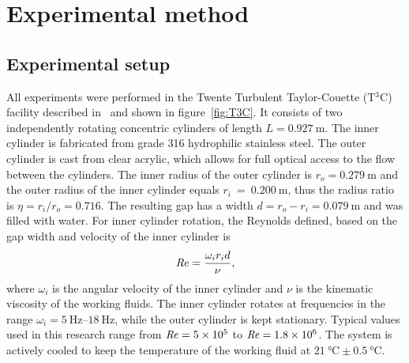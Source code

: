 \section{Experimental method}

\subsection{Experimental setup}
All experiments were performed in the Twente Turbulent Taylor-Couette (T$^3$C) facility described in~\citet{VanGils2011} and shown in figure~\ref{fig:T3C}.
 It consists of two independently rotating concentric cylinders of length $L = \SI{0.927}{\metre}$. The inner cylinder is fabricated from grade 316 hydrophilic stainless steel. The outer cylinder is cast from clear acrylic, which allows for full optical access to the flow between the cylinders. The inner radius of the outer cylinder is $r_o = \SI{0.279}{\metre}$ %
and the outer radius of the inner cylinder equals $r_i~=~\SI{0.200}{\metre}$, thus the radius ratio is $\eta = r_i / r_o = 0.716$. %
 The resulting gap has a width $d = r_o - r_i =
\SI{0.079}{\metre}$
 and was filled with  water. For inner cylinder rotation, the Reynolds defined, based on the gap width and velocity of the inner cylinder is
\begin{equation}\label{eq:Rey}
\mbox{\textit{Re}} = \frac{\omega_i r_i d}{\nu},
\end{equation}
where $\omega_i$ is the angular velocity of the inner cylinder and $\nu$ is the kinematic viscosity of the working fluids. The inner cylinder rotates at frequencies in the range $\omega_i = \SIrange{5}{18}{\hertz}$, while the outer cylinder is kept stationary. Typical values used in this research range from $\mbox{\textit{Re}} = 5 \times 10^5$ to $\mbox{\textit{Re}} = 1.8 \times 10^6$. The system is actively cooled to keep the temperature of the working fluid at $\SI{21}{\degreeCelsius} \pm \SI{0.5}{\degreeCelsius}$.

